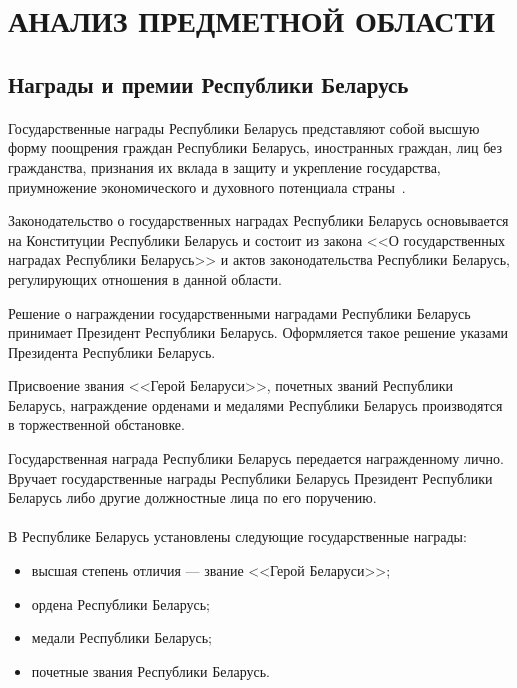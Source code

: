 \section[Анализ предметной области]{АНАЛИЗ ПРЕДМЕТНОЙ ОБЛАСТИ}

\subsection{Награды и премии Республики Беларусь}

\paragraph{}
Государственные награды Республики Беларусь представляют собой
высшую форму поощрения граждан Республики Беларусь, иностранных граждан,
лиц без гражданства, признания их вклада в защиту и укрепление государства,
приумножение экономического и духовного потенциала страны~\cite{bel_orders}.

Законодательство о государственных наградах Республики Беларусь основывается
на Конституции Республики Беларусь и состоит из закона
<<О государственных наградах Республики Беларусь>> и актов законодательства
Республики Беларусь, регулирующих отношения в данной области.

Решение о награждении государственными наградами Республики Беларусь
принимает Президент Республики Беларусь.
Оформляется такое решение указами Президента Республики Беларусь.

Присвоение звания <<Герой Беларуси>>, почетных званий Республики Беларусь,
награждение орденами и медалями Республики Беларусь производятся
в торжественной обстановке.

Государственная награда Республики Беларусь передается награжденному лично.
Вручает государственные награды Республики Беларусь
Президент Республики Беларусь либо другие должностные лица по его поручению. 

\paragraph{}
В Республике Беларусь установлены следующие государственные награды:
\begin{itemize}
\item высшая степень отличия --- звание <<Герой Беларуси>>;
\item ордена Республики Беларусь;
\item медали Республики Беларусь;
\item почетные звания Республики Беларусь.
\end{itemize}

